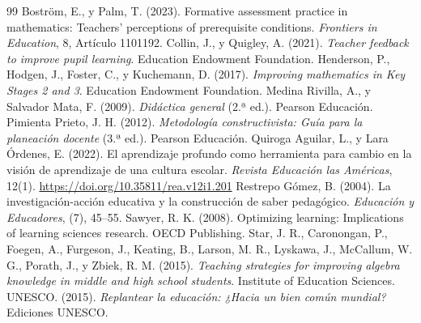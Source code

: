 \documentclass[spanish,letterpaper,oneside]{article}
\begin{document}
\clearpage
\begin{thebibliography}{99}
 Boström, E., y Palm, T. (2023). Formative assessment practice in mathematics: Teachers' perceptions of prerequisite conditions. \textit{Frontiers in Education}, 8, Artículo 1101192.
 Collin, J., y Quigley, A. (2021). \textit{Teacher feedback to improve pupil learning}. Education Endowment Foundation.
 Henderson, P., Hodgen, J., Foster, C., y Kuchemann, D. (2017). \textit{Improving mathematics in Key Stages 2 and 3}. Education Endowment Foundation.
 Medina Rivilla, A., y Salvador Mata, F. (2009). \textit{Didáctica general} (2.ª ed.). Pearson Educación.
 Pimienta Prieto, J. H. (2012). \textit{Metodología constructivista: Guía para la planeación docente} (3.ª ed.). Pearson Educación.
 Quiroga Aguilar, L., y Lara Órdenes, E. (2022). El aprendizaje profundo como herramienta para cambio en la visión de aprendizaje de una cultura escolar. \textit{Revista Educación las Américas}, 12(1). \url{https://doi.org/10.35811/rea.v12i1.201}
 Restrepo Gómez, B. (2004). La investigación-acción educativa y la construcción de saber pedagógico. \textit{Educación y Educadores}, (7), 45--55.
 Sawyer, R. K. (2008). Optimizing learning: Implications of learning sciences research. OECD Publishing.
 Star, J. R., Caronongan, P., Foegen, A., Furgeson, J., Keating, B., Larson, M. R., Lyskawa, J., McCallum, W. G., Porath, J., y Zbiek, R. M. (2015). \textit{Teaching strategies for improving algebra knowledge in middle and high school students}. Institute of Education Sciences.
 UNESCO. (2015). \textit{Replantear la educación: ¿Hacia un bien común mundial?} Ediciones UNESCO.
\end{thebibliography}
\end{document}
